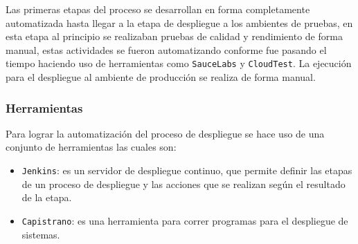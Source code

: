 
Las primeras etapas del proceso se desarrollan en forma completamente automatizada
hasta llegar a la etapa de despliegue a los ambientes de pruebas, en esta etapa
al principio se realizaban pruebas de calidad y rendimiento de forma manual, estas
actividades se fueron automatizando conforme fue pasando el tiempo haciendo uso de
herramientas como \texttt{SauceLabs} y \texttt{CloudTest}. La ejecución para
el despliegue al ambiente de producción se realiza de forma manual.

\subsubsection{Herramientas}

Para lograr la automatización del proceso de despliegue se hace uso de una conjunto
de herramientas las cuales son:

\begin{itemize}
\item \texttt{Jenkins}: es un servidor de despliegue continuo, que permite
  definir las etapas de un proceso de despliegue y las acciones que se realizan
  según el resultado de la etapa.
\item \texttt{Capistrano}: es una herramienta para correr programas para el
  despliegue de sistemas.
\end{itemize}


